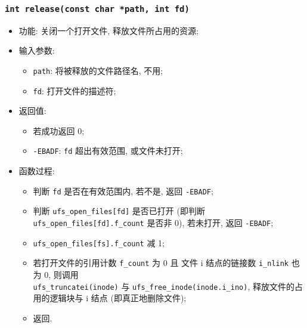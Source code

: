 \documentclass[nofonts, titlepage]{ctexart}
\begin{document}
  \subsubsection[\texttt{release}]{\texttt{int release(const char *path, int fd)}}
  \begin{itemize}
\item
  功能: 关闭一个打开文件, 释放文件所占用的资源;
\item
  输入参数:

  \begin{itemize}
  \item
    \texttt{path}: 将被释放的文件路径名, 不用;
  \item
    \texttt{fd}: 打开文件的描述符;
  \end{itemize}
\item
  返回值:

  \begin{itemize}
  \item
    若成功返回 0;
  \item
    \texttt{-EBADF}: \texttt{fd} 超出有效范围, 或文件未打开;
  \end{itemize}
\item
  函数过程:

  \begin{itemize}
  \item
    判断 \texttt{fd} 是否在有效范围内, 若不是, 返回 \texttt{-EBADF};
  \item
    判断 \texttt{ufs\_open\_files{[}fd{]}} 是否已打开 (即判断
    \texttt{ufs\_open\_files{[}fd{]}.f\_count} 是否非 0), 若未打开, 返回
    \texttt{-EBADF};
  \item
    \texttt{ufs\_open\_files{[}fs{]}.f\_count} 减 1;
  \item 若打开文件的引用计数 \verb'f_count' 为 0 且 文件 i 结点的链接数
      \verb'i_nlink' 也为 0, 则调用 \\\texttt{ufs\_truncatei(inode)} 与 
      \verb'ufs_free_inode(inode.i_ino)', 释放文件的占用的逻辑块与 i 结点
      (即真正地删除文件);
  \item
    返回.
  \end{itemize}
  \end{itemize}
\end{document}
